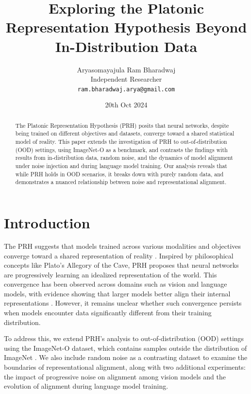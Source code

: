 \documentclass[10pt,a4paper]{article}
\title{Exploring the Platonic Representation Hypothesis Beyond In-Distribution Data}
\author{Aryasomayajula Ram Bharadwaj\\
Independent Researcher\\
\texttt{ram.bharadwaj.arya@gmail.com}}
\date{20th Oct 2024}
\begin{document}
\maketitle

\begin{abstract}
The Platonic Representation Hypothesis (PRH) \cite{huh2024prh} posits that neural networks, despite being trained on different objectives and datasets, converge toward a shared statistical model of reality. This paper extends the investigation of PRH to out-of-distribution (OOD) settings, using ImageNet-O as a benchmark, and contrasts the findings with results from in-distribution data, random noise, and the dynamics of model alignment under noise injection and during language model training. Our analysis reveals that while PRH holds in OOD scenarios, it breaks down with purely random data, and demonstrates a nuanced relationship between noise and representational alignment.
\end{abstract}

\section{Introduction}
The PRH suggests that models trained across various modalities and objectives converge toward a shared representation of reality \cite{huh2024prh}. Inspired by philosophical concepts like Plato’s Allegory of the Cave, PRH proposes that neural networks are progressively learning an idealized representation of the world. This convergence has been observed across domains such as vision and language models, with evidence showing that larger models better align their internal representations \cite{huh2024prh}. However, it remains unclear whether such convergence persists when models encounter data significantly different from their training distribution.

To address this, we extend PRH's analysis to out-of-distribution (OOD) settings using the ImageNet-O dataset, which contains samples outside the distribution of ImageNet \cite{hendrycks2021nae}. We also include random noise as a contrasting dataset to examine the boundaries of representational alignment, along with two additional experiments: the impact of progressive noise on alignment among vision models and the evolution of alignment during language model training.
\end{document}
